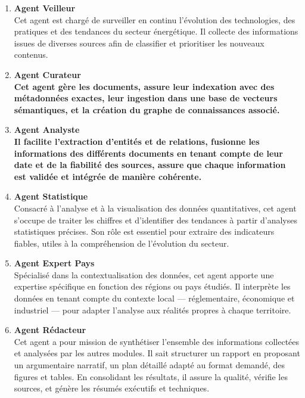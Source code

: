 \documentclass[a4paper,11pt]{report}
\providecommand{\tightlist}{\setlength{\itemsep}{0pt}\setlength{\parskip}{0pt}}
\begin{document}
\begin{enumerate}
\def\labelenumi{\arabic{enumi}.}
\tightlist
\item
  \textbf{Agent Veille\textbf{ur}}\\
  Cet agent est chargé de surveiller en continu l'évolution des technologies, des pratiques et des tendances du secteur énergétique. Il collecte des informations issues de diverses sources afin de classifier et prioritiser les nouveaux contenus.
\item
  \textbf{\textbf{Agent }\textbf{C}\textbf{urateur\\
  }\textbf{Cet agent gère les documents, assure leur indexation avec des métadonnées exactes, leur ingestion dans une base de vecteurs sémantiques, et la création du graphe de connaissances associé.}}
\item
  \textbf{\textbf{Agent }\textbf{A}\textbf{nalyste\\
  }\textbf{Il facilite l'extraction d'entités et de relations, fusionne les informations des différents }\textbf{documents en tenant compte de leur date et de la fiabilité des sources, assure que chaque information est validée et intégrée de manière cohérente.}}
\item
  \textbf{Agent Statistique}\\
  Consacré à l'analyse et à la visualisation des données quantitatives, cet agent s'occupe de traiter les chiffres et d'identifier des tendances à partir d'analyses statistiques précises. Son rôle est essentiel pour extraire des indicateurs fiables, utiles à la compréhension de l'évolution du secteur.
\item
  \textbf{Agent Expert Pays}\\
  Spécialisé dans la contextualisation des données, cet agent apporte une expertise spécifique en fonction des régions ou pays étudiés. Il interprète les données en tenant compte du contexte local --- réglementaire, économique et industriel --- pour adapter l'analyse aux réalités propres à chaque territoire.
\item
  \textbf{Agent Rédacteur}\\
  Cet agent a pour mission de synthétiser l'ensemble des informations collectées et analysées par les autres modules. Il sait structurer un rapport en proposant un argumentaire narratif, un plan détaillé adapté au format demandé, des figures et tables. En consolidant les résultats, il assure la qualité, vérifie les sources, et génère les résumés exécutifs et techniques.
\end{enumerate}
\end{document}
